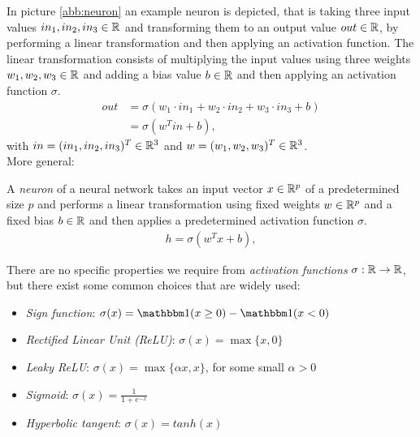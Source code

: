 In picture \ref{abb:neuron} an example neuron is depicted, that is taking three input values $in_1, in_2, in_3 \in \mathbb{R}$ and transforming them to an output value $out\in \mathbb{R}$, by performing a linear transformation and then applying an activation function. The linear transformation consists of multiplying the input values using three weights $w_1, w_2, w_3\in \mathbb{R}$ and adding a bias value $b\in \mathbb{R}$ and then applying an activation function $\sigma$.
\begin{align*}
    out& = \sigma(w_1 \cdot in_1 + w_2 \cdot in_2 + w_3\cdot in_3 + b)\\
    & = \sigma(w^T in + b),
\end{align*}
with $in=(in_1,in_2,in_3)^T\in\mathbb{R}^3$ and $w=(w_1,w_2,w_3)^T\in\mathbb{R}^3$.\\
More general:
\begin{definition}
    A \textit{neuron} of a neural network takes an input vector $x\in\mathbb{R}^p$ of a predetermined size $p$ and performs a linear transformation using fixed weights $w\in\mathbb{R}^p$ and a fixed bias $b\in\mathbb{R}$
    and then applies a predetermined activation function $\sigma$.
\begin{align*}
    h  = \sigma(w^T x + b),
\end{align*}
\end{definition}

\begin{example}
There are no specific properties we require from \textit{activation functions} $\sigma: \mathbb{R} \rightarrow \mathbb{R}$, but there exist some common choices that are widely used:
\begin{itemize}
    \item \textit{Sign function}: $\sigma(x) = \one(x \geq 0) - \one(x < 0)$
    \item \textit{Rectified Linear Unit (ReLU)}: $\sigma(x) = \max\{x, 0\}$
    \item \textit{Leaky ReLU}: $ \sigma(x) = \max\{\alpha x,x\}$, for some small $\alpha > 0$
    \item \textit{Sigmoid}: $\sigma(x) = \frac{1}{1 + e^{-x}}$
    \item \textit{Hyperbolic tangent}: $\sigma(x) = tanh(x)$
\end{itemize}
\end{example}

